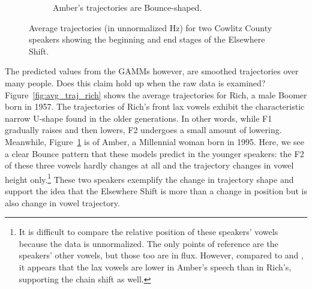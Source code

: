 \begin{figure}[tb!]
\begin{subfigure}[t]{2.925in}
        \caption{Amber's trajectories are Bounce-shaped.}
        \label{fig:avg_traj_amber}
    \end{subfigure}
    \hspace{\fill}
    \caption{Average trajectories (in unnormalized Hz) for two Cowlitz County speakers showing the beginning and end stages of the Elsewhere Shift.}
    \label{fig:rich_and_amber}
\end{figure}

The predicted values from the GAMMs however, are smoothed trajectories over many people. Does this claim hold up when the raw data is examined? Figure~\ref{fig:avg_traj_rich} shows the average trajectories for Rich, a male Boomer born in 1957. The trajectories of Rich's front lax vowels exhibit the characteristic narrow U-shape found in the older generations. In other words, while F1 gradually raises and then lowers, F2 undergoes a small amount of lowering. Meanwhile, Figure~\ref{fig:avg_traj_amber} is of Amber, a Millennial woman born in 1995. Here, we see a clear Bounce pattern that these models predict in the younger speakers: the F2 of these three vowels hardly changes at all and the trajectory changes in vowel height only.\footnote{It is difficult to compare the relative position of these speakers' vowels because the data is unnormalized. The only points of reference are the speakers' other vowels, but those too are in flux. However, compared to \fleece and \face, it appears that the lax vowels are lower in Amber's speech than in Rich's, supporting the chain shift as well.} These two speakers exemplify the change in trajectory shape and support the idea that the Elsewhere Shift is more than a change in position but is also change in vowel trajectory.

